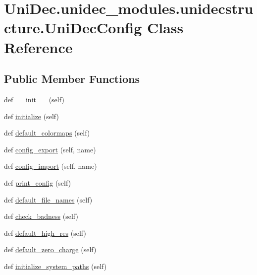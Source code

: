 \hypertarget{class_uni_dec_1_1unidec__modules_1_1unidecstructure_1_1_uni_dec_config}{}\section{Uni\+Dec.\+unidec\+\_\+modules.\+unidecstructure.\+Uni\+Dec\+Config Class Reference}
\label{class_uni_dec_1_1unidec__modules_1_1unidecstructure_1_1_uni_dec_config}
\subsection*{Public Member Functions}
\begin{DoxyCompactItemize}
\item 
def \hyperlink{class_uni_dec_1_1unidec__modules_1_1unidecstructure_1_1_uni_dec_config_a2faabae99205ce431c514f8a91d56137}{\+\_\+\+\_\+init\+\_\+\+\_\+} (self)
\item 
def \hyperlink{class_uni_dec_1_1unidec__modules_1_1unidecstructure_1_1_uni_dec_config_a670a191438a9c03b3404790c18d2f7a5}{initialize} (self)
\item 
def \hyperlink{class_uni_dec_1_1unidec__modules_1_1unidecstructure_1_1_uni_dec_config_a17a3f8ac3a90aaa752f95088931d6e2e}{default\+\_\+colormaps} (self)
\item 
def \hyperlink{class_uni_dec_1_1unidec__modules_1_1unidecstructure_1_1_uni_dec_config_a99bf59b933d3bece6b212b66fce30140}{config\+\_\+export} (self, name)
\item 
def \hyperlink{class_uni_dec_1_1unidec__modules_1_1unidecstructure_1_1_uni_dec_config_aace6ba83535d94abc4103eaa36df8249}{config\+\_\+import} (self, name)
\item 
def \hyperlink{class_uni_dec_1_1unidec__modules_1_1unidecstructure_1_1_uni_dec_config_a1333e92e66859b37f3c18d80c1215586}{print\+\_\+config} (self)
\item 
def \hyperlink{class_uni_dec_1_1unidec__modules_1_1unidecstructure_1_1_uni_dec_config_a093279eb5544594d2ad085dc71f7a6db}{default\+\_\+file\+\_\+names} (self)
\item 
def \hyperlink{class_uni_dec_1_1unidec__modules_1_1unidecstructure_1_1_uni_dec_config_a521acaa64df84ce3cc88a44f483e4881}{check\+\_\+badness} (self)
\item 
def \hyperlink{class_uni_dec_1_1unidec__modules_1_1unidecstructure_1_1_uni_dec_config_ab6445b2be1a8bf62f192a41e809301d2}{default\+\_\+high\+\_\+res} (self)
\item 
def \hyperlink{class_uni_dec_1_1unidec__modules_1_1unidecstructure_1_1_uni_dec_config_a76e5841086f13fb348cd3f1e024d5c29}{default\+\_\+zero\+\_\+charge} (self)
\item 
def \hyperlink{class_uni_dec_1_1unidec__modules_1_1unidecstructure_1_1_uni_dec_config_a690977297e5d00f22be65d3ea0b6c2f6}{initialize\+\_\+system\+\_\+paths} (self)
\end{DoxyCompactItemize}

